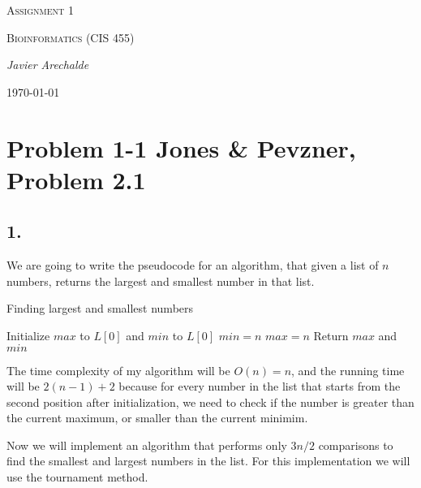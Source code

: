 \documentclass{article}
\begin{document}
\begin{titlepage}
	\centering
	{\scshape\LARGE Assignment 1\par}
	\vspace{1cm}
	{\scshape\Large Bioinformatics (CIS 455)\par}
	\vspace{1.5cm}
	{\Large\itshape Javier Arechalde\par}
	\vfill
	{\large \today\par}
\end{titlepage}

\section*{Problem 1-1 Jones \& Pevzner, Problem 2.1}
  
\subsection*{1.}

We are going to write the pseudocode for an algorithm, that given a list of $n$ numbers, returns the largest and smallest number in that list.

\begin{algorithm}
\caption{Finding largest and smallest numbers}
\begin{algorithmic}[1]
\State Initialize $max$ to $L[0]$ and $min$ to $L[0]$
  \State $min = n$
 \EndIf 
  \State $max = n$
 \EndIf
\EndFor
\State Return $max$ and $min$
\end{algorithmic}
\end{algorithm}

The time complexity of my algorithm will be $O(n) = n$, and the running time will be $2(n-1)+2$ because for every number in the list that starts from the second position after initialization, we need to check if the number is greater than the current maximum, or smaller than the current minimim.

Now we will implement an algorithm that performs only $3n/2$ comparisons to find the smallest and largest numbers in the list. For this implementation we will use the tournament method.
\end{document}
